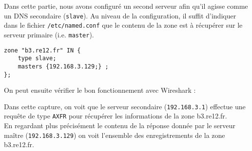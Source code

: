 \documentclass[12pt,a4paper,notitlepage]{article}
\begin{document}
Dans cette partie, nous avons configuré un second serveur afin qu'il agisse comme un DNS secondaire (\texttt{slave}). Au niveau de la configuration, il suffit d'indiquer dans le fichier \texttt{/etc/named.conf} que le contenu de la zone est à récupérer sur le serveur primaire (i.e. \texttt{master}).\\


\begin{lstlisting}[title=Configuration du serveur secondaire]
zone "b3.re12.fr" IN {
	type slave;
	masters {192.168.3.129;} ;
};
\end{lstlisting}\bigskip
On peut ensuite vérifier le bon fonctionnement avec Wireshark :


Dans cette capture, on voit que le serveur secondaire (\texttt{192.168.3.1}) effectue une requête de type \texttt{AXFR} pour récupérer les informations de la  zone b3.re12.fr.\\

En regardant plus précisément le contenu de la réponse donnée par le serveur maître (\texttt{192.168.3.129}) on voit l'ensemble des enregistrements de la zone b3.re12.fr.
\end{document}
